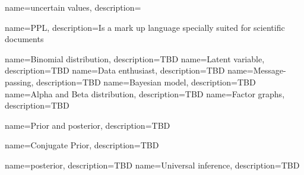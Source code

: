 \usepackage{glossaries}
 
\makeglossaries
 

{
    name=uncertain values,
    description={}
}


{
    name=PPL,
    description={Is a mark up language specially suited 
    for scientific documents}
}

{
    name=Binomial distribution,
    description={TBD}
}
{
    name=Latent variable,
    description={TBD}
}
{
    name=Data enthusiast,
    description={TBD}
}
{
    name=Message-passing,
    description={TBD}
}
{
    name=Bayesian model,
    description={TBD}
}
{
    name=Alpha and Beta distribution,
    description={TBD}
}
{
    name=Factor graphs,
    description={TBD}
}

{
    name=Prior and posterior,
    description={TBD}
}

{
    name=Conjugate Prior,
    description={TBD}
}


{
    name=posterior,
    description={TBD}
}
{
    name=Universal inference,
    description={TBD}
}